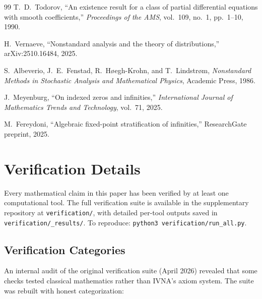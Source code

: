 \documentclass[12pt]{article}
\theoremstyle{definition}
\theoremstyle{remark}
\begin{document}
\begin{thebibliography}{99}
T.~D.~Todorov, ``An existence result for a class of partial differential
equations with smooth coefficients,'' \emph{Proceedings of the AMS},
vol.~109, no.~1, pp.~1--10, 1990.

H.~Vernaeve, ``Nonstandard analysis and the theory of distributions,''
arXiv:2510.16484, 2025.

S.~Albeverio, J.~E.~Fenstad, R.~H\o egh-Krohn, and T.~Lindstr\o m,
\emph{Nonstandard Methods in Stochastic Analysis and Mathematical Physics},
Academic Press, 1986.

J.~Meyenburg, ``On indexed zeros and infinities,''
\emph{International Journal of Mathematics Trends and Technology},
vol.~71, 2025.

M.~Fereydoni, ``Algebraic fixed-point stratification of infinities,''
ResearchGate preprint, 2025.

\end{thebibliography}


\appendix
\section{Verification Details}
\label{app:verification}

Every mathematical claim in this paper has been verified by at least
one computational tool. The full verification suite is available in
the supplementary repository at \texttt{verification/}, with detailed
per-tool outputs saved in \texttt{verification/\_results/}. To
reproduce: \texttt{python3 verification/run\_all.py}.

\subsection{Verification Categories}

An internal audit of the original verification suite (April 2026)
revealed that some checks tested classical mathematics rather than
IVNA's axiom system. The suite was rebuilt with honest categorization:
\end{document}
